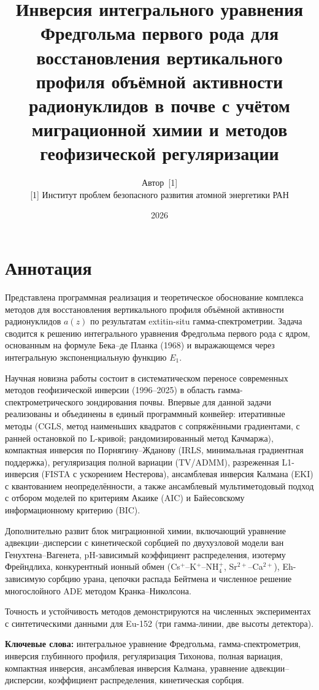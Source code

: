 \documentclass[12pt,a4paper]{article}
\title{
  Инверсия интегрального уравнения Фредгольма первого рода\newline
  для восстановления вертикального профиля объёмной активности\newline
  радионуклидов в почве с учётом миграционной химии\newline
  и методов геофизической регуляризации
}
\author{
  Автор~[1] \\
  \smallskip
   \small [1] Институт проблем безопасного развития атомной энергетики РАН
}
\date{2026}
\newcommand{\Eone}{E_{1}}
\begin{document}
\maketitle

\section*{Аннотация}

Представлена программная реализация и теоретическое обоснование комплекса методов для
восстановления вертикального профиля объёмной активности радионуклидов $a(z)$
по результатам 	extit{in-situ} гамма-спектрометрии.
Задача сводится к решению интегрального уравнения Фредгольма первого рода с ядром,
основанным на формуле Бека--де Планка (1968) и выражающемся через
интегральную экспоненциальную функцию $\Eone$.

Научная новизна работы состоит в систематическом переносе современных методов
геофизической инверсии (1996--2025) в область гамма-спектрометрического
зондирования почвы.
Впервые для данной задачи реализованы и объединены в единый программный конвейер:
итеративные методы (CGLS, метод наименьших квадратов с сопряжёнными градиентами,
с ранней остановкой по L-кривой; рандомизированный метод Качмаржа),
компактная инверсия по Порнягину--Жданову (IRLS, минимальная градиентная поддержка),
регуляризация полной вариации (TV/ADMM),
разреженная L1-инверсия (FISTA с ускорением Нестерова),
ансамблевая инверсия Калмана (EKI) с квантованием неопределённости,
а также ансамблевый мультиметодовый подход с отбором моделей по критериям Акаике (AIC)
и Байесовскому информационному критерию (BIC).

Дополнительно развит блок миграционной химии, включающий уравнение адвекции--дисперсии
с кинетической сорбцией по двухузловой модели ван Генухтена--Вагенета,
pH-зависимый коэффициент распределения, изотерму Фрейндлиха,
конкурентный ионный обмен (Cs$^+$--K$^+$--NH$_4^+$, Sr$^{2+}$--Ca$^{2+}$),
Eh-зависимую сорбцию урана, цепочки распада Бейтмена и численное решение
многослойного ADE методом Кранка--Николсона.

Точность и устойчивость методов демонстрируются на численных экспериментах
с синтетическими данными для Eu-152 (три гамма-линии, две высоты детектора).

\medskip
\noindent\textbf{Ключевые слова:}
интегральное уравнение Фредгольма, гамма-спектрометрия, инверсия глубинного
профиля, регуляризация Тихонова, полная вариация, компактная инверсия,
ансамблевая инверсия Калмана, уравнение адвекции--дисперсии, коэффициент
распределения, кинетическая сорбция.
\end{document}
